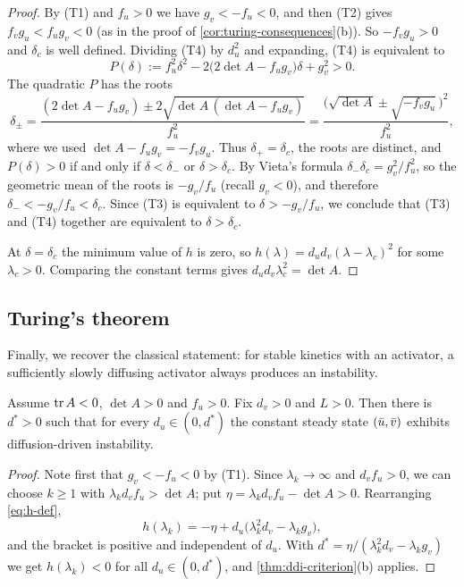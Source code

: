 \begin{proof}
By (T1) and $f_u>0$ we have $g_v<-f_u<0$, and then (T2) gives
$f_vg_u<f_ug_v<0$ (as in the proof of \cref{cor:turing-consequences}(b)). So
$-f_vg_u>0$ and $\delta_c$ is well defined.
Dividing (T4) by $d_u^2$ and expanding, (T4) is equivalent to
\begin{equation*}
  P(\delta) := f_u^2\delta^2 - 2\big(2\det A - f_ug_v\big)\delta + g_v^2 > 0 .
\end{equation*}
The quadratic $P$ has the roots
\begin{equation*}
  \delta_\pm = \frac{(2\det A-f_ug_v)\pm2\sqrt{\det A\,(\det A-f_ug_v)}}{f_u^2}
  = \frac{\big(\sqrt{\det A}\pm\sqrt{-f_vg_u}\,\big)^2}{f_u^2},
\end{equation*}
where we used $\det A-f_ug_v=-f_vg_u$. Thus $\delta_+=\delta_c$, the roots are
distinct, and $P(\delta)>0$ if and only if $\delta<\delta_-$ or $\delta>\delta_c$. By
Vieta's formula $\delta_-\delta_c=g_v^2/f_u^2$, so the geometric mean of the roots is
$-g_v/f_u$ (recall $g_v<0$), and therefore $\delta_-<-g_v/f_u<\delta_c$. Since (T3)
is equivalent to $\delta>-g_v/f_u$, we conclude that (T3) and (T4) together are
equivalent to $\delta>\delta_c$.

At $\delta=\delta_c$ the minimum value of $h$ is zero, so
$h(\lambda)=d_ud_v(\lambda-\lambda_c)^2$ for some $\lambda_c>0$. Comparing the
constant terms gives $d_ud_v\lambda_c^2=\det A$.
\end{proof}

\subsection{Turing's theorem}

Finally, we recover the classical statement: for stable kinetics with an activator,
a sufficiently slowly diffusing activator always produces an instability.

\begin{theorem}\label{thm:turing-small-du}
Assume $\operatorname{tr} A<0$, $\det A>0$ and $f_u>0$. Fix $d_v>0$ and $L>0$. Then there is
$d^*>0$ such that for every $d_u\in(0,d^*)$ the constant steady state $(\bar u,\bar v)$
exhibits diffusion-driven instability.
\end{theorem}

\begin{proof}
Note first that $g_v<-f_u<0$ by (T1). Since $\lambda_k\to\infty$ and $d_vf_u>0$, we
can choose $k\ge1$ with $\lambda_kd_vf_u>\det A$; put $\eta=\lambda_kd_vf_u-\det A>0$.
Rearranging \eqref{eq:h-def},
\begin{equation*}
  h(\lambda_k) = -\eta + d_u\big(\lambda_k^2d_v - \lambda_kg_v\big),
\end{equation*}
and the bracket is positive and independent of $d_u$. With
$d^*=\eta/(\lambda_k^2d_v-\lambda_kg_v)$ we get $h(\lambda_k)<0$ for all
$d_u\in(0,d^*)$, and \cref{thm:ddi-criterion}(b) applies.
\end{proof}

